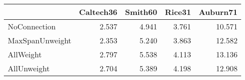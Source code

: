 \begin{tabular}{lrrrr}
\toprule
{} & Caltech36 & Smith60 & Rice31 & Auburn71 \\
\midrule
NoConnection    &     2.537 &   4.941 &  3.761 &   10.571 \\
MaxSpanUnweight &     2.353 &   5.240 &  3.863 &   12.582 \\
AllWeight       &     2.797 &   5.538 &  4.113 &   13.136 \\
AllUnweight     &     2.704 &   5.389 &  4.198 &   12.908 \\
\bottomrule
\end{tabular}
